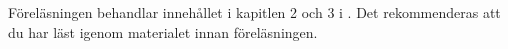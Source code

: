 Föreläsningen behandlar innehållet i kapitlen 2 och 
3 i \cite{Brookshear2012csa}.
Det rekommenderas att du har läst igenom materialet innan föreläsningen.

